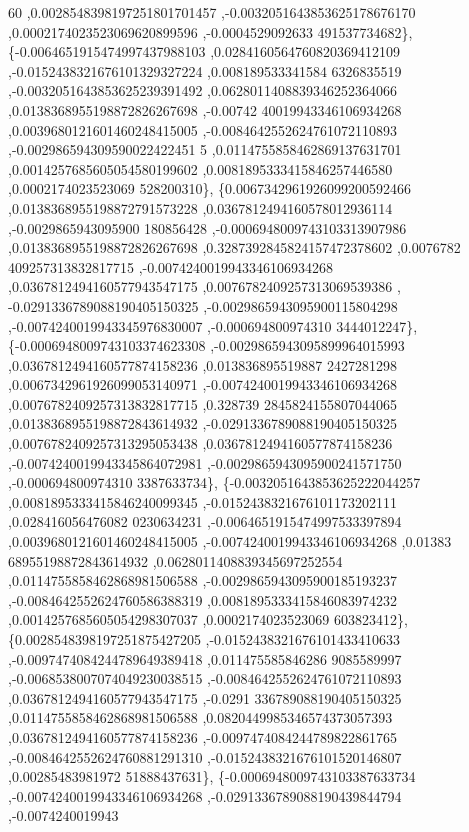 \begin{DoxyCode}
      60 ,0.0028548398197251801701457 ,-0.0032051643853625178676170 ,0.0002174023523069620899596 ,-0.0004529092633
      491537734682\},
\{-0.0064651915474997437988103 ,0.0284160564760820369412109 ,-0.0152438321676101329327224 ,0.008189533341584
      6326835519 ,-0.0032051643853625239391492 ,0.0628011408839346252364066 ,0.0138368955198872826267698 ,-0.00742
      40019943346106934268 ,0.0039680121601460248415005 ,-0.0084642552624761072110893 ,-0.002986594309590022422451
      5 ,0.0114755858462869137631701 ,0.0014257685605054580199602 ,0.0081895333415846257446580 ,0.0002174023523069
      528200310\},
\{0.0067342961926099200592466 ,0.0138368955198872791573228 ,0.0367812494160578012936114 ,-0.0029865943095900
      180856428 ,-0.0006948009743103313907986 ,0.0138368955198872826267698 ,0.3287392845824157472378602 ,0.0076782
      409257313832817715 ,-0.0074240019943346106934268 ,0.0367812494160577943547175 ,0.0076782409257313069539386 ,
      -0.0291336789088190405150325 ,-0.0029865943095900115804298 ,-0.0074240019943345976830007 ,-0.000694800974310
      3444012247\},
\{-0.0006948009743103374623308 ,-0.0029865943095899964015993 ,0.0367812494160577874158236 ,0.013836895519887
      2427281298 ,0.0067342961926099053140971 ,-0.0074240019943346106934268 ,0.0076782409257313832817715 ,0.328739
      2845824155807044065 ,0.0138368955198872843614932 ,-0.0291336789088190405150325 ,0.0076782409257313295053438 
      ,0.0367812494160577874158236 ,-0.0074240019943345864072981 ,-0.0029865943095900241571750 ,-0.000694800974310
      3387633734\},
\{-0.0032051643853625222044257 ,0.0081895333415846240099345 ,-0.0152438321676101173202111 ,0.028416056476082
      0230634231 ,-0.0064651915474997533397894 ,0.0039680121601460248415005 ,-0.0074240019943346106934268 ,0.01383
      68955198872843614932 ,0.0628011408839345697252554 ,0.0114755858462868981506588 ,-0.0029865943095900185193237
       ,-0.0084642552624760586388319 ,0.0081895333415846083974232 ,0.0014257685605054298307037 ,0.0002174023523069
      603823412\},
\{0.0028548398197251875427205 ,-0.0152438321676101433410633 ,-0.0097474084244789649389418 ,0.011475585846286
      9085589997 ,-0.0068538007074049230038515 ,-0.0084642552624761072110893 ,0.0367812494160577943547175 ,-0.0291
      336789088190405150325 ,0.0114755858462868981506588 ,0.0820449985346574373057393 ,0.0367812494160577874158236
       ,-0.0097474084244789822861765 ,-0.0084642552624760881291310 ,-0.0152438321676101520146807 ,0.00285483981972
      51888437631\},
\{-0.0006948009743103387633734 ,-0.0074240019943346106934268 ,-0.0291336789088190439844794 ,-0.0074240019943

\end{DoxyCode}
